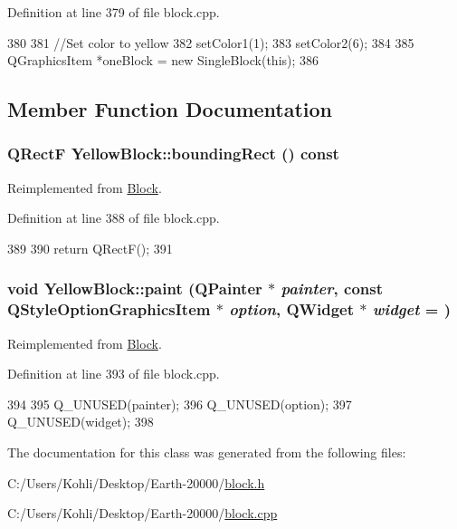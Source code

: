 Definition at line 379 of file block.cpp.


\begin{DoxyCode}
380 {
381     //Set color to yellow
382     setColor1(1);
383     setColor2(6);
384 
385     QGraphicsItem *oneBlock = new SingleBlock(this);
386 }
\end{DoxyCode}


\subsection{Member Function Documentation}
\hypertarget{class_yellow_block_a05f341c5d1b859d8c7b909a5cfee7601}{
\subsubsection[{boundingRect}]{\setlength{\rightskip}{0pt plus 5cm}QRectF YellowBlock::boundingRect () const}}
\label{class_yellow_block_a05f341c5d1b859d8c7b909a5cfee7601}


Reimplemented from \hyperlink{class_block_aee4444b92a82f5a8080e9019ef1e554d}{Block}.

Definition at line 388 of file block.cpp.


\begin{DoxyCode}
389 {
390     return QRectF();
391 }
\end{DoxyCode}
\hypertarget{class_yellow_block_a37c29857cc065cab86a81bcfdd6c3f63}{
\subsubsection[{paint}]{\setlength{\rightskip}{0pt plus 5cm}void YellowBlock::paint (QPainter $\ast$ {\em painter}, \/  const QStyleOptionGraphicsItem $\ast$ {\em option}, \/  QWidget $\ast$ {\em widget} = {})}}
\label{class_yellow_block_a37c29857cc065cab86a81bcfdd6c3f63}


Reimplemented from \hyperlink{class_block_a36791d086b6fad1a2203bfef6fdbaa0a}{Block}.

Definition at line 393 of file block.cpp.


\begin{DoxyCode}
394 {
395     Q_UNUSED(painter);
396     Q_UNUSED(option);
397     Q_UNUSED(widget);
398 }
\end{DoxyCode}


The documentation for this class was generated from the following files:\begin{DoxyCompactItemize}
\item 
C:/Users/Kohli/Desktop/Earth-\/20000/\hyperlink{block_8h}{block.h}\item 
C:/Users/Kohli/Desktop/Earth-\/20000/\hyperlink{block_8cpp}{block.cpp}\end{DoxyCompactItemize}
